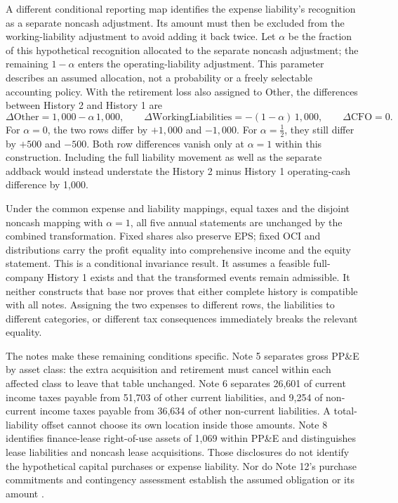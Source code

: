 A different conditional reporting map identifies the expense liability's
recognition as a separate noncash adjustment. Its amount must then be
excluded from the working-liability adjustment to avoid adding it back
twice. Let $\alpha$ be the fraction of this hypothetical recognition
allocated to the separate noncash adjustment; the remaining $1-\alpha$
enters the operating-liability adjustment. This parameter describes an
assumed allocation, not a probability or a freely selectable accounting
policy. With the retirement loss also assigned to Other, the differences
between History 2 and History 1 are
\[
\Delta\mathrm{Other}=1{,}000-\alpha\,1{,}000,
\qquad
\Delta\mathrm{WorkingLiabilities}=-(1-\alpha)\,1{,}000,
\qquad
\Delta\mathrm{CFO}=0.
\]
For $\alpha=0$, the two rows differ by $+1{,}000$ and $-1{,}000$.
For $\alpha=\tfrac12$, they still differ by $+500$ and $-500$.
Both row differences vanish only at $\alpha=1$ within this construction.
Including the full liability movement as well as the separate addback
would instead understate the History 2 minus History 1 operating-cash
difference by 1,000.

Under the common expense and liability mappings, equal taxes and the
disjoint noncash mapping with $\alpha=1$, all five annual statements are
unchanged by the combined transformation. Fixed shares also preserve EPS;
fixed OCI and distributions carry the profit equality into comprehensive
income and the equity statement. This is a conditional invariance result.
It assumes a feasible full-company History 1 exists and that the transformed
events remain admissible. It neither constructs that base nor proves that
either complete history is compatible with all notes. Assigning the two
expenses to different rows, the liabilities to different categories, or
different tax consequences immediately breaks the relevant equality.

The notes make these remaining conditions specific. Note 5 separates gross
PP\&E by asset class: the extra acquisition and retirement must cancel
within each affected class to leave that table unchanged. Note 6 separates
26,601 of current income taxes payable from 51,703 of other current
liabilities, and 9,254 of non-current income taxes payable from 36,634 of
other non-current liabilities. A total-liability offset cannot choose its
own location inside those amounts. Note 8 identifies finance-lease
right-of-use assets of 1,069 within PP\&E and distinguishes lease liabilities
and noncash lease acquisitions. Those disclosures do not identify the
hypothetical capital purchases or expense liability. Nor do Note 12's
purchase commitments and contingency assessment establish the assumed
obligation or its amount
\citep[printed pp.~39, 42, 45--46]{apple2024}.

